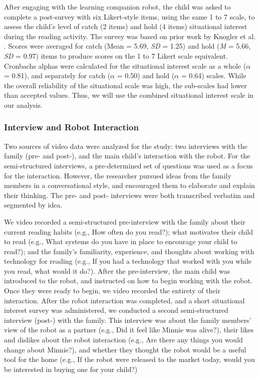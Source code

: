 \documentclass{sigchi}
\begin{document}
  After engaging with the learning companion robot, the child was asked to complete a post-survey with six Likert-style items, using the same 1 to 7 scale, to assess the child's level of catch (2 items) and hold (4 items) situational interest during the reading activity. The survey was based on prior work by Knogler et al. \cite{Knogler:2015}. Scores were averaged for catch (Mean = 5.69, \textit{SD} = 1.25) and hold (\textit{M} = 5.66, \textit{SD} = 0.97) items to produce scores on the 1 to 7 Likert scale equivalent. Cronbachs alphas were calculated for the situational interest scale as a whole ($\alpha$ = 0.81), and separately for catch ($\alpha$ = 0.50) and hold ($\alpha$ = 0.64) scales. While the overall reliability of the situational scale was high, the sub-scales had lower than accepted values. Thus, we will use the combined situational interest scale in our analysis.
  
\subsubsection{Interview and Robot Interaction}
  Two sources of video data were analyzed for the study: two interviews with the family (pre- and post-), and the main child's interaction with the robot. For the semi-structured interviews, a pre-determined set of questions was used as a focus for the interaction. However, the researcher pursued ideas from the family members in a conversational style, and encouraged them to elaborate and explain their thinking. The pre- and post- interviews were both transcribed verbatim and segmented by idea\cite{Chi:1997}.
 
  We video recorded a semi-structured pre-interview with the family about their current reading habits (e.g., How often do you read?); what motivates their child to read (e.g., What systems do you have in place to encourage your child to read?); and the family's familiarity, experience, and thoughts about working with technology for reading (e.g., If you had a technology that worked with you while you read, what would it do?). After the pre-interview, the main child was introduced to the robot, and instructed on how to begin working with the robot. Once they were ready to begin, we video recorded the entirety of their interaction. After the robot interaction was completed, and a short situational interest survey was administered, we conducted a second semi-structured interview (post-) with the family. This interview was about the family members' view of the robot as a partner (e.g., Did it feel like Minnie was alive?), their likes and dislikes about the robot interaction (e.g., Are there any things you would change about Minnie?), and whether they thought the robot would be a useful tool for the home (e.g., If the robot were released to the market today, would you be interested in buying one for your child?)
  
\end{document}
